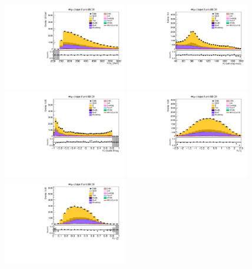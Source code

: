 \begin{figure}[tbp]
  \begin{center}
    \includegraphics[width=0.48\textwidth]{figures/wlnhbb2016/boosted/WmnWHTT1bFJCR_fj1Pt.pdf}
    \includegraphics[width=0.48\textwidth]{figures/wlnhbb2016/boosted/WmnWHTT1bFJCR_fj1MSD_corr.pdf}
    \includegraphics[width=0.48\textwidth]{figures/wlnhbb2016/boosted/WmnWHTT1bFJCR_fj1DoubleCSV.pdf}
    \includegraphics[width=0.48\textwidth]{figures/wlnhbb2016/boosted/WmnWHTT1bFJCR_fj1Eta.pdf}
    \includegraphics[width=0.48\textwidth]{figures/wlnhbb2016/boosted/WmnWHTT1bFJCR_fj1Tau21SD.pdf}

\end{center}
\end{figure}
